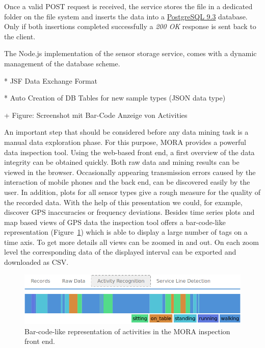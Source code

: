 \documentclass[times, 10pt,twocolumn]{article}
\begin{document}
Once a valid POST request is received, the service stores the file in a dedicated folder on the file system and inserts the data into a \href{http://www.postgresql.org/}{PostgreSQL 9.3} database.
Only if both insertions completed successfully a {\em 200 OK} response is sent back to the client.

The Node.js implementation of the sensor storage service, comes with a dynamic management of the database scheme.

* JSF Data Exchange Format

* Auto Creation of DB Tables for new sample types (JSON data type)



+ Figure: Screenshot mit Bar-Code Anzeige von Activities


An important step that should be considered before any data mining task is a manual data exploration phase. For this purpose, MORA provides a powerful data inspection tool. Using the web-based front end, a first overview of the data integrity can be obtained quickly. Both raw data and mining results can be viewed in the browser. Occasionally appearing transmission errors caused by the interaction of mobile phones and the back end, can be discovered easily by the user. In addition, plots for all sensor types give a rough measure for the quality of the recorded data. With the help of this presentation we could, for example, discover GPS inaccuracies or frequency deviations. Besides time series plots and map based views of GPS data the inspection tool offers a bar-code-like representation (Figure~\ref{fig:inspection}) which is able to display a large number of tags on a time axis. To get more details all views can be zoomed in and out. On each zoom level the corresponding data of the displayed interval can be exported and downloaded as CSV.


\begin{figure}[h]
\includegraphics[width=\linewidth]{img/BarcodeScreenshot.png}
\caption{Bar-code-like representation of activities in the MORA inspection front end.}
\label{fig:inspection}
\end{figure}
\end{document}

